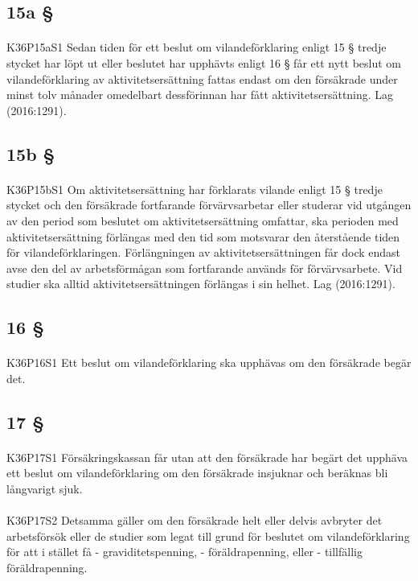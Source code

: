 \documentclass[a4paper,notitlepage,openany,10pt]{book}
\begin{document}
\subsection*{15a §}
\paragraph*{}
{\tiny K36P15aS1}
Sedan tiden för ett beslut om vilandeförklaring enligt 15 § tredje stycket har löpt ut eller beslutet har upphävts enligt 16 § får ett nytt beslut om vilandeförklaring av aktivitetsersättning fattas endast om den försäkrade under minst tolv månader omedelbart dessförinnan har fått aktivitetsersättning.
Lag (2016:1291).
\subsection*{15b §}
\paragraph*{}
{\tiny K36P15bS1}
Om aktivitetsersättning har förklarats vilande enligt 15 § tredje stycket och den försäkrade fortfarande förvärvsarbetar eller studerar vid utgången av den period som beslutet om aktivitetsersättning omfattar, ska perioden med aktivitetsersättning förlängas med den tid som motsvarar den återstående tiden för vilandeförklaringen. Förlängningen av aktivitetsersättningen får dock endast avse den del av arbetsförmågan som fortfarande används för förvärvsarbete. Vid studier ska alltid aktivitetsersättningen förlängas i sin helhet.
Lag (2016:1291).
\subsection*{16 §}
\paragraph*{}
{\tiny K36P16S1}
Ett beslut om vilandeförklaring ska upphävas om den försäkrade begär det.
\subsection*{17 §}
\paragraph*{}
{\tiny K36P17S1}
Försäkringskassan får utan att den försäkrade har begärt det upphäva ett beslut om vilandeförklaring om den försäkrade insjuknar och beräknas bli långvarigt sjuk.
\paragraph*{}
{\tiny K36P17S2}
Detsamma gäller om den försäkrade helt eller delvis avbryter det arbetsförsök eller de studier som legat till grund för beslutet om vilandeförklaring för att i stället få
\newline - graviditetspenning,
\newline - föräldrapenning, eller
\newline - tillfällig föräldrapenning.
\end{document}
